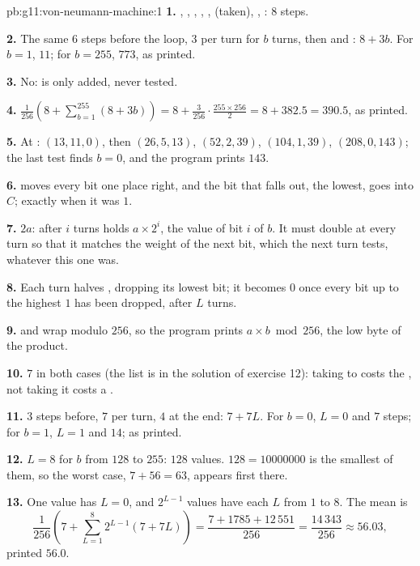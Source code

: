 \begin{solution}{pb:g11:von-neumann-machine:1}
\textbf{1.} , , , , ,  (taken), ,
: $8$ steps.

\textbf{2.} The same $6$ steps before the loop, $3$ per turn for $b$ turns, then  and :
$8 + 3b$. For $b = 1$, $11$; for $b = 255$, $773$, as printed.

\textbf{3.} No:  is only added, never tested.

\textbf{4.} $\frac{1}{256}\left(8 + \sum_{b=1}^{255} (8 + 3b)\right) = 8 + \frac{3}{256} \cdot \frac{255 \times 256}{2}
= 8 + 382.5 = 390.5$, as printed.

\textbf{5.} At : $(13, 11, 0)$, then $(26, 5, 13)$, $(52, 2, 39)$, $(104, 1, 39)$, $(208, 0, 143)$; the
last test finds $b = 0$, and the program prints $143$.

\textbf{6.}  moves every bit one place right, and the bit that falls out, the lowest, goes into $C$;
  exactly when it was $1$.

\textbf{7.} $2a$: after $i$ turns  holds $a \times 2^i$, the value of bit $i$ of $b$. It must double at every
turn so that it matches the weight of the next bit, which the next turn tests, whatever this one was.

\textbf{8.} Each turn halves , dropping its lowest bit; it becomes $0$ once every bit up to the highest $1$
has been dropped, after $L$ turns.

\textbf{9.}  and  wrap modulo $256$, so the program prints $a \times b \bmod 256$, the low byte of
the product.

\textbf{10.} $7$ in both cases (the list is in the solution of exercise 12): taking  to  costs the
, not taking it costs a .

\textbf{11.} $3$ steps before, $7$ per turn, $4$ at the end: $7 + 7L$. For $b = 0$, $L = 0$ and $7$ steps; for
$b = 1$, $L = 1$ and $14$; as printed.

\textbf{12.} $L = 8$ for $b$ from $128$ to $255$: $128$ values. $128 = 10000000$ is the smallest of them, so the
worst case, $7 + 56 = 63$, appears first there.

\textbf{13.} One value has $L = 0$, and $2^{L - 1}$ values have each $L$ from $1$ to $8$. The mean is
\[ \frac{1}{256}\left(7 + \sum_{L=1}^{8} 2^{L-1}(7 + 7L)\right) = \frac{7 + 1785 + 12\,551}{256} =
\frac{14\,343}{256} \approx 56.03, \]
printed $56.0$.


\end{solution}
